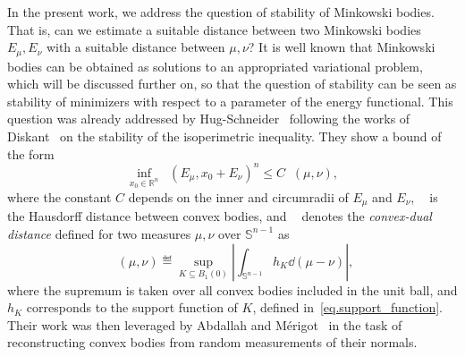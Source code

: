 \documentclass[a4paper, 10pt, twoside]{amsart}
\numberwithin{equation}{section}
\theoremstyle{plain}
\theoremstyle{definition}
\DeclareMathOperator{\dc}{\mathrm{d}_\mathrm{C}}
\DeclareMathOperator{\dH}{\mathrm{d}_\mathrm{H}}
\begin{document}
In the present work, we address the question of stability of Minkowski bodies. That is, can we estimate a suitable distance between two Minkowski bodies $E_\mu, E_\nu$ with a suitable distance between $\mu,\nu$? It is well known that Minkowski bodies can be obtained as solutions to an appropriated variational problem, which will be discussed further on, so that the question of stability can be seen as stability of minimizers with respect to a parameter of the energy functional. This question was already addressed by Hug-Schneider~\cite{hug2002stability} following the works of Diskant~\cite{diskant1972bounds} on the stability of the isoperimetric inequality. They show a bound of the form 
\[
    \inf_{x_0 \in \mathbb{R}^n} 
    \dH(E_\mu, x_0 + E_\nu)^n 
    \le C \dc(\mu,\nu), 
\]
where the constant $C$ depends on the inner and circumradii of $E_\mu$ and $E_\nu$, $\dH$ is the Hausdorff distance between convex bodies, and $\dc$ denotes the \textit{convex-dual distance} defined for two measures $\mu,\nu$ over $\mathbb{S}^{n-1}$ as 
\begin{equation}\label{eq.convex_dual_distance}
    \dc(\mu,\nu) 
    \eqdef 
    \sup_{K \subseteq B_1(0)} 
    \left|
        \int_{\mathbb{S}^{n-1}} h_K \dd (\mu-\nu)
    \right|,
\end{equation}
where the supremum is taken over all convex bodies included in the unit ball, and $h_K$ corresponds to the support function of $K$, defined in~\eqref{eq.support_function}. Their work was then leveraged by Abdallah and Mérigot~\cite{abdallah2015reconstruction} in the task of reconstructing convex bodies from random measurements of their normals. 
\end{document}
